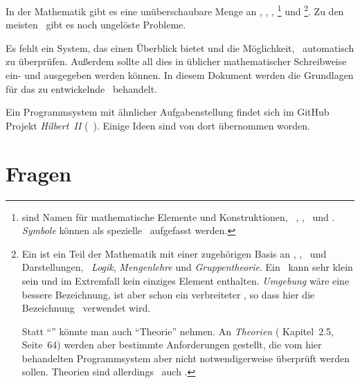 In der Mathematik gibt es eine unüberschaubare Menge an \Axiomen, \Saetzen, \Beweisen, \emph{\Fachbegriffen}%
\footnote{%
	 sind Namen für mathematische Elemente und Konstruktionen, \textzB\ \Axiomen, \Saetze, \Beweise\ und \Fachgebiete.
	\emph{Symbole} können als spezielle \Fachbegriffe\ aufgefasst werden.
}
und \emph{\Fachgebieten}%
\footnote{%
	Ein  ist ein Teil der Mathematik mit einer zugehörigen Basis an \Axiomen, \Saetzen, \Fachbegriffen\ und Darstellungen, \textzB\ \emph{Logik}, \emph{Mengenlehre} und \emph{Gruppentheorie}.
	Ein \Fachgebiet\ kann sehr klein sein und im Extremfall kein einziges Element enthalten.
	\emph{Umgebung} wäre eine bessere Bezeichnung, ist aber schon ein verbreiteter \Fachbegriff, so dass hier die Bezeichnung \Fachgebiet\ verwendet wird.

	Statt \enquote{\Fachgebiet} könnte man auch \enquote{Theorie} nehmen.
	An \emph{Theorien} ( Kapitel~2.5, Seite~64) werden aber bestimmte Anforderungen gestellt, die vom hier behandelten Programmsystem aber nicht notwendigerweise überprüft werden sollen.
	Theorien sind allerdings \textiAlg\ auch \Fachgebiete.
}.
Zu den meisten \Fachgebieten\ gibt es noch ungelöste Probleme.

Es fehlt ein System, das einen Überblick bietet und die Möglichkeit, \Beweise\ automatisch zu überprüfen.
Außerdem sollte all dies in üblicher mathematischer Schreibweise ein- und ausgegeben werden können.
In diesem Dokument werden die Grundlagen für das zu entwickelnde \ASBA\ behandelt.

Ein Programmsystem mit ähnlicher Aufgabenstellung findet sich im GitHub Projekt \emph{Hilbert~II} (\seename~\cite{bib:HilbertII, bib:qedeq}).
Einige Ideen sind von dort übernommen worden.

\section{Fragen}%
\label{sec:Fragen}

